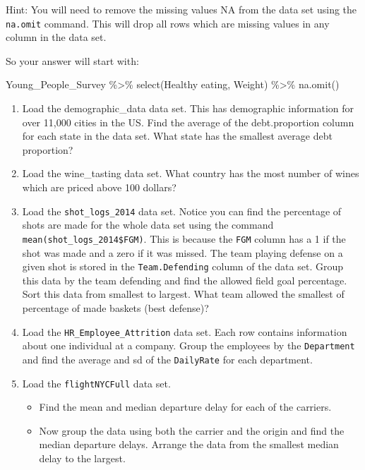 \documentclass[
]{book}
\newenvironment{Shaded}{\begin{snugshade}}{\end{snugshade}}
\newcommand{\AttributeTok}[1]{\textcolor[rgb]{0.77,0.63,0.00}{#1}}
\newcommand{\FunctionTok}[1]{\textcolor[rgb]{0.00,0.00,0.00}{#1}}
\newcommand{\NormalTok}[1]{#1}
\newcommand{\SpecialCharTok}[1]{\textcolor[rgb]{0.00,0.00,0.00}{#1}}
\newcommand{\StringTok}[1]{\textcolor[rgb]{0.31,0.60,0.02}{#1}}
\providecommand{\tightlist}{%
  \setlength{\itemsep}{0pt}\setlength{\parskip}{0pt}}
\theoremstyle{definition}
\theoremstyle{definition}
\theoremstyle{definition}
\theoremstyle{definition}
\theoremstyle{remark}
\begin{document}
Hint: You will need to remove the missing values NA from the data set using the \texttt{na.omit} command. This will drop all rows which are missing values in any column in the data set.

So your answer will start with:

\begin{Shaded}
\begin{Highlighting}[]
\NormalTok{Young\_People\_Survey }\SpecialCharTok{\%\textgreater{}\%}
    \FunctionTok{select}\NormalTok{(}\StringTok{\textasciigrave{}}\AttributeTok{Healthy eating}\StringTok{\textasciigrave{}}\NormalTok{, Weight) }\SpecialCharTok{\%\textgreater{}\%}
    \FunctionTok{na.omit}\NormalTok{()}
\end{Highlighting}
\end{Shaded}

\begin{enumerate}
\def\labelenumi{\arabic{enumi}.}
\setcounter{enumi}{1}
\item
  Load the demographic\_data data set. This has demographic information for over 11,000 cities in the US. Find the average of the debt.proportion column for each state in the data set. What state has the smallest average debt proportion?
\item
  Load the wine\_tasting data set. What country has the most number of wines which are priced above 100 dollars?
\item
  Load the \texttt{shot\_logs\_2014} data set. Notice you can find the percentage of shots are made for the whole data set using the command \texttt{mean(shot\_logs\_2014\$FGM)}. This is because the \texttt{FGM} column has a 1 if the shot was made and a zero if it was missed. The team playing defense on a given shot is stored in the \texttt{Team.Defending} column of the data set. Group this data by the team defending and find the allowed field goal percentage. Sort this data from smallest to largest. What team allowed the smallest of percentage of made baskets (best defense)?
\item
  Load the \texttt{HR\_Employee\_Attrition} data set. Each row contains information about one individual at a company. Group the employees by the \texttt{Department} and find the average and sd of the \texttt{DailyRate} for each department.
\item
  Load the \texttt{flightNYCFull} data set.

  \begin{itemize}
  \tightlist
  \item
    Find the mean and median departure delay for each of the carriers.
  \item
    Now group the data using both the carrier and the origin and find the median departure delays. Arrange the data from the smallest median delay to the largest.
  \end{itemize}
\end{enumerate}
\end{document}
